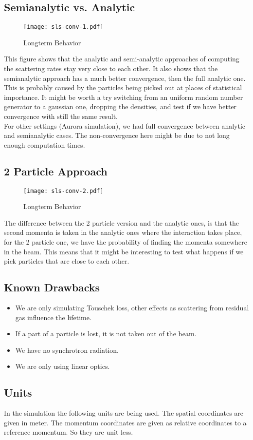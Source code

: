 \subsection{Semianalytic vs. Analytic}
\begin{figure}[here]
 \centering
 \texttt{[image: sls-conv-1.pdf]}
 \caption{Longterm Behavior}
\end{figure}
This figure shows that the analytic and semi-analytic approaches of computing the scattering rates stay very close to each other. It also shows that the semianalytic approach has a much better convergence, then the full analytic one. This is probably caused by the particles being picked out at places of statistical importance. It might be worth a try switching from an uniform random number generator to a gaussian one, dropping the densities, and test if we have better convergence with still the same result.\\
For other settings (Aurora simulation), we had full convergence between analytic and semianalytic cases. The non-convergence here might be due to not long enough computation times.
\subsection{2 Particle Approach}
\begin{figure}[here]
 \centering
 \texttt{[image: sls-conv-2.pdf]}
 \caption{Longterm Behavior}
\end{figure}
The difference between the 2 particle version and the analytic ones, is that the second momenta is taken in the analytic ones where the interaction takes place, for the 2 particle one, we have the probability of finding the momenta somewhere in the beam. This means that it might be interesting to test what happens if we pick particles that are close to each other.

\subsection{Known Drawbacks}
\begin{itemize}
\item We are only simulating Touschek loss, other effects as scattering from residual gas influence the lifetime.
\item If a part of a particle is lost, it is not taken out of the beam.
\item We have no synchrotron radiation.
\item We are only using linear optics.
\end{itemize}

\subsection{Units}
In the simulation the following units are being used. The spatial coordinates are given in meter. The momentum coordinates are given as relative coordinates to a reference momentum. So they are unit less.

